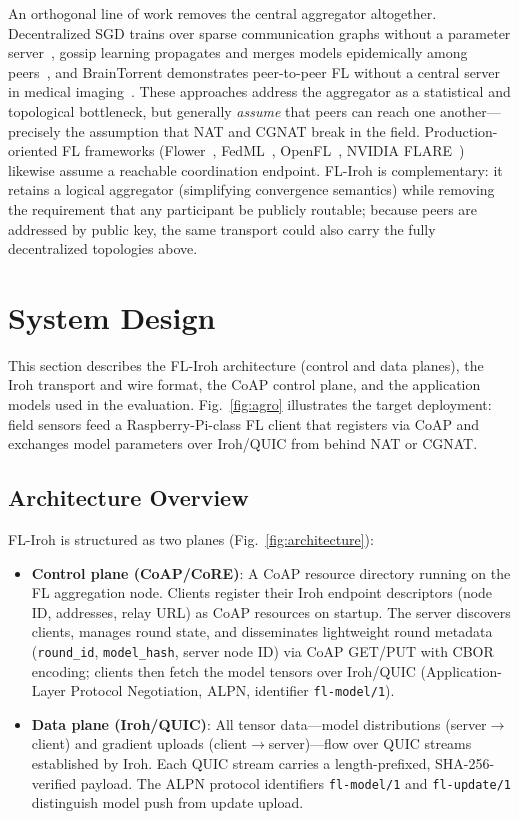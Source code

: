\documentclass[a4paper,fleqn]{cas-dc}
\begin{document}
An orthogonal line of work removes the central aggregator altogether. Decentralized SGD trains over sparse communication graphs without a parameter server~\cite{lian2017}, gossip learning propagates and merges models epidemically among peers~\cite{hegedus2019}, and BrainTorrent demonstrates peer-to-peer FL without a central server in medical imaging~\cite{roy2019braintorrent}. These approaches address the aggregator as a statistical and topological bottleneck, but generally \emph{assume} that peers can reach one another---precisely the assumption that NAT and CGNAT break in the field. Production-oriented FL frameworks (Flower~\cite{flower2022}, FedML~\cite{fedml2020}, OpenFL~\cite{openfl2022}, NVIDIA FLARE~\cite{flare2022}) likewise assume a reachable coordination endpoint. FL-Iroh is complementary: it retains a logical aggregator (simplifying convergence semantics) while removing the requirement that any participant be publicly routable; because peers are addressed by public key, the same transport could also carry the fully decentralized topologies above.

\section{System Design}
\label{sec:system}

This section describes the FL-Iroh architecture (control and data planes), the Iroh transport and wire format, the CoAP control plane, and the application models used in the evaluation. Fig.~\ref{fig:agro} illustrates the target deployment: field sensors feed a Raspberry-Pi-class FL client that registers via CoAP and exchanges model parameters over Iroh/QUIC from behind NAT or CGNAT.

\subsection{Architecture Overview}

FL-Iroh is structured as two planes (Fig.~\ref{fig:architecture}):

\begin{itemize}
    \item \textbf{Control plane (CoAP/CoRE)}: A CoAP resource directory running on the FL aggregation node. Clients register their Iroh endpoint descriptors (node ID, addresses, relay URL) as CoAP resources on startup. The server discovers clients, manages round state, and disseminates lightweight round metadata (\texttt{round\_id}, \texttt{model\_hash}, server node ID) via CoAP GET/PUT with CBOR encoding; clients then fetch the model tensors over Iroh/QUIC (Application-Layer Protocol Negotiation, ALPN, identifier \texttt{fl-model/1}).
    \item \textbf{Data plane (Iroh/QUIC)}: All tensor data---model distributions (server$\to$client) and gradient uploads (client$\to$server)---flow over QUIC streams established by Iroh. Each QUIC stream carries a length-prefixed, SHA-256-verified payload. The ALPN protocol identifiers \texttt{fl-model/1} and \texttt{fl-update/1} distinguish model push from update upload.
\end{itemize}
\end{document}
